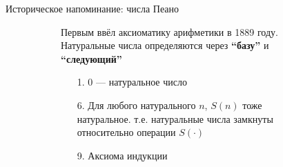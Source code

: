 \begin{frame}{Историческое напоминание: числа Пеано}
\begin{figure}[ht]
  \begin{subfigure}[t]{.55\textwidth}
  \vspace{-8em}
  Первым ввёл аксиоматику арифметики в 1889 году. Натуральные числа определяются через \textbf{\enquote{базу}} и \textbf{\enquote{следующий}}\\

  \begin{enumerate}
  \item[1.] 0 --- натуральное число
  \item[6.] Для любого натурального $n$, $S(n)$ тоже натуральное. т.е. натуральные числа замкнуты относительно операции $S(\cdot)$
  \item [9.] Аксиома индукции
  \end{enumerate}


\end{subfigure}
\end{figure}
\end{frame}
